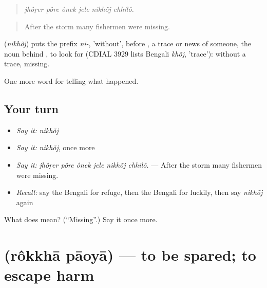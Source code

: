 \begin{quote}
     
\end{quote}

\begin{quote}
\emph{jhôṛer pôre ônek jele nikhõj chhilô.}
\end{quote}

\begin{quote}
After the storm many fishermen were missing.
\end{quote}

\begin{cousinweb}
\textbf{} (\emph{nikhõj}) puts the prefix \emph{ni-}, 'without', before , a trace or news of someone, the noun behind \textbf{}, to look for (CDIAL 3929 lists Bengali \emph{khõj}, 'trace'): without a trace, missing.
\end{cousinweb}

\begin{grammarlens}[title={What you've built}]
One more word for telling what happened.
\end{grammarlens}

\subsection*{Your turn}
\begin{itemize}
\raggedright
  \item \emph{Say it:} \emph{nikhõj}
  \item \emph{Say it:} \emph{nikhõj}, once more
  \item \emph{Say it:} \emph{jhôṛer pôre ônek jele nikhõj chhilô.} — After the storm many fishermen were missing.
  \item \emph{Recall:} say the Bengali for refuge, then the Bengali for luckily, then say \emph{nikhõj} again
\end{itemize}

\begin{tcolorbox}[breakable,colback=teal!4,colframe=teal!35!black,title={Before you move on}]
What does  mean? (\textquotedblleft{}Missing\textquotedblright{}.) Say it once more.
\end{tcolorbox}
\section[\texorpdfstring{\bn{রক্ষা} \bn{পাওয়া} (rôkkhā pāoyā)}{রক্ষা পাওয়া (rôkkhā pāoyā)}]{  (rôkkhā pāoyā) — to be spared; to escape harm}

